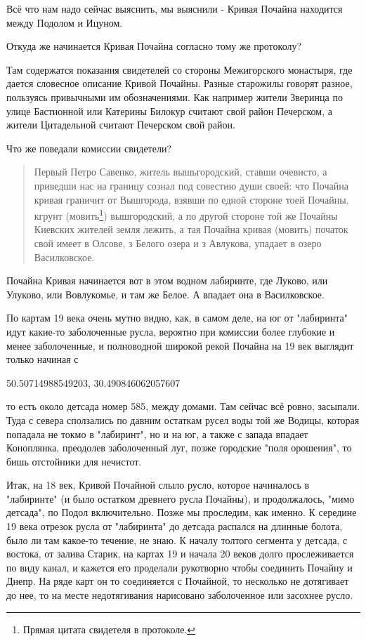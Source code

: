 Всё что нам надо сейчас выяснить, мы выяснили - Кривая Почайна находится между Подолом и Ицуном.  

Откуда же начинается Кривая Почайна согласно тому же протоколу?

Там содержатся показания свидетелей со стороны Межигорского монастыря, где дается словесное описание Кривой Почайны. Разные старожилы говорят разное, пользуясь привычными им обозначениями. Как например жители Зверинца по улице Бастионной или Катерины Билокур считают свой район Печерском, а жители Цитадельной считают Печерском свой район.

Что же поведали комиссии свидетели?

\begin{quotation}
Первый Петро Савенко, житель вышьгородский, ставши очевисто, а приведши нас на границу сознал под совестию души своей: что Почайна кривая граничит от Вышгорода, взявши по едной стороне тоей Почайны, кгрунт (мовить\footnote{Прямая цитата свидетеля в протоколе.}) вышгородский, а по другой стороне той же Почайны Киевских жителей земля лежить, а тая Почайна кривая (мовить) початок свой имеет в Олсове, з Белого озера и з Авлукова, упадает в озеро Василковское.
\end{quotation}
 
Почайна Кривая начинается вот в этом водном лабиринте, где Луково, или Улуково, или Вовлукомье, и там же Белое. А впадает она в Василковское.

По картам 19 века очень мутно видно, как, в самом деле, на юг от "лабиринта" идут какие-то заболоченные русла, вероятно при комиссии более глубокие и менее заболоченные, и полноводной широкой рекой Почайна на 19 век выглядит только начиная с 

50.50714988549203, 30.490846062057607

то есть около детсада номер 585, между домами. Там сейчас всё ровно, засыпали. Туда с севера сползались по давним остаткам русел воды той же Водицы, которая попадала не токмо в "лабиринт", но и на юг, а также с запада впадает Коноплянка, преодолев заболоченный луг, позже городские "поля орошения", то бишь отстойники для нечистот.

Итак, на 18 век, Кривой Почайной слыло русло, которое начиналось в "лабиринте" (и было остатком древнего русла Почайны), и продолжалось, "мимо детсада", по Подол включительно. Позже мы проследим, как именно. К середине 19 века отрезок русла от "лабиринта" до детсада распался на длинные болота, было ли там какое-то течение, не знаю. К началу толтого сегмента у детсада, с востока, от залива Старик, на картах 19 и начала 20 веков долго прослеживается по виду канал, и кажется его проделали рукотворно чтобы соединить Почайну и Днепр. На ряде карт он то соединяется с Почайной, то несколько не дотягивает до нее, то на месте недотягивания нарисовано заболоченное или засохнее русло.

